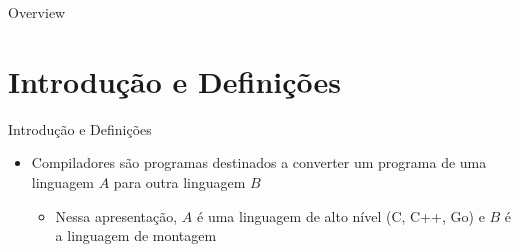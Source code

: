 \customtitlepage


\begin{frame}{Overview}
  \overview
\end{frame}

\section{Introdução e Definições}

\begin{frame}{Introdução e Definições}
  \begin{itemize}
    \item Compiladores são programas destinados a converter um programa de uma linguagem $A$ para outra linguagem $B$
        \begin{itemize}
            \item Nessa apresentação, $A$ é uma linguagem de alto nível (C, C++, Go) e $B$ é a linguagem de montagem
        \end{itemize}
  \end{itemize}
\end{frame}

